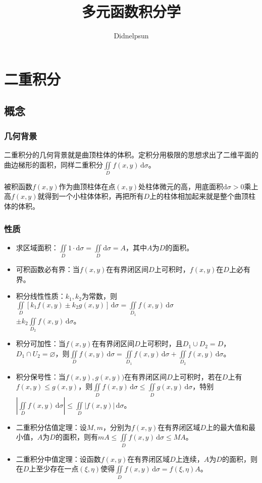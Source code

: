 \documentclass[UTF8, 12pt]{ctexart}
\author{Didnelpsun}
\title{多元函数积分学}
\date{}
\begin{document}
\maketitle
\pagestyle{empty}
\thispagestyle{empty}
\tableofcontents
\thispagestyle{empty}
\newpage
\pagestyle{plain}
\setcounter{page}{1}
\section{二重积分}

\subsection{概念}

\subsubsection{几何背景}

二重积分的几何背景就是曲顶柱体的体积。定积分用极限的思想求出了二维平面的曲边梯形的面积，同样二重积分$\iint\limits_Df(x,y)\,\textrm{d}\sigma$。

被积函数$f(x,y)$作为曲顶柱体在点$(x,y)$处柱体微元的高，用底面积$\textrm{d}\sigma>0$乘上高$f(x,y)$就得到一个小柱体体积，再把所有$D$上的柱体相加起来就是整个曲顶柱体的体积。

\subsubsection{性质}

\begin{itemize}
    \item 求区域面积：$\iint\limits_D1\cdot\textrm{d}\sigma=\iint\limits_D\textrm{d}\sigma=A$，其中$A$为$D$的面积。
    \item 可积函数必有界：当$f(x,y)$在有界闭区间$D$上可积时，$f(x,y)$在$D$上必有界。
    \item 积分线性性质：$k_1,k_2$为常数，则$\iint\limits_D[k_1f(x,y)\pm k_2g(x,y)]\,\textrm{d}\sigma=\iint\limits_{D_1}f(x,y)\,\textrm{d}\sigma$\\$\pm k_2\iint\limits_{D_2}f(x,y)\,\textrm{d}\sigma$。
    \item 积分可加性：当$f(x,y)$在有界闭区间$D$上可积时，且$D_1\cup D_2=D$，$D_1\cap U_2=\varnothing$，则$\iint\limits_Df(x,y)\,\textrm{d}\sigma=\iint\limits_{D_1}f(x,y)\,\textrm{d}\sigma+\iint\limits_{D_2}f(x,y)\,\textrm{d}\sigma$。
    \item 积分保号性：当$f(x,y),g(x,y))$在有界闭区间$D$上可积时，若在$D$上有$f(x,y)\leqslant g(x,y)$，则$\iint\limits_Df(x,y)\,\textrm{d}\sigma\leqslant\iint\limits_Dg(x,y)\,\textrm{d}\sigma$，特别$\left\vert\iint\limits_Df(x,y)\,\textrm{d}\sigma\right\vert\leqslant\iint\limits_D\vert f(x,y)\vert\,\textrm{d}\sigma$。
    \item 二重积分估值定理：设$M,m$，分别为$f(x,y)$在有界闭区域$D$上的最大值和最小值，$A$为$D$的面积，则有$mA\leqslant\iint\limits_Df(x,y)\,\textrm{d}\sigma\leqslant MA$。
    \item 二重积分中值定理：设函数$f(x,y)$在有界闭区域$D$上连续，$A$为$D$的面积，则在$D$上至少存在一点$(\xi,\eta)$使得$\iint\limits_Df(x,y)\,\textrm{d}\sigma=f(\xi,\eta)A$。
\end{itemize}
\end{document}
